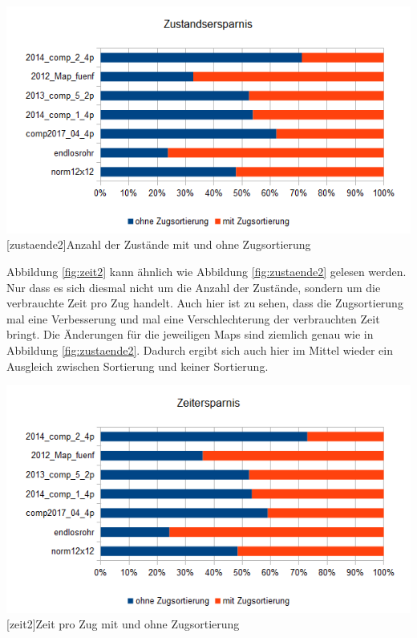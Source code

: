 \documentclass[12pt,a4paper,bibliography=totocnumbered,listof=totocnumbered]{scrartcl}
\begin{document}
    \vspace{1em}
    \begin{minipage}{\linewidth}
    	\centering
    	\includegraphics[width=1\linewidth]{pics/Kapitel_4/ZustandZugSort.png}
    	[zustaende2]{Anzahl der Zustände mit und ohne Zugsortierung}
    	\label{fig:zustaende2}
    \end{minipage}
    \vspace{1em}
    
    Abbildung \ref{fig:zeit2} kann ähnlich wie Abbildung \ref{fig:zustaende2} gelesen werden. Nur dass es sich diesmal nicht um die Anzahl der Zustände, sondern um die verbrauchte Zeit pro Zug handelt. Auch hier ist zu sehen, dass die Zugsortierung mal eine Verbesserung und mal eine Verschlechterung der verbrauchten Zeit bringt. Die Änderungen für die jeweiligen Maps sind ziemlich genau wie in Abbildung \ref{fig:zustaende2}. Dadurch ergibt sich auch hier im Mittel wieder ein Ausgleich zwischen Sortierung und keiner Sortierung.\newline
    
    
    \vspace{1em}
    \begin{minipage}{\linewidth}
    	\centering
    	\includegraphics[width=1\linewidth]{pics/Kapitel_4/ZeitZugSort.png}
    	[zeit2]{Zeit pro Zug mit und ohne Zugsortierung}
    	\label{fig:zeit2}
    \end{minipage}
    \vspace{1em}
    
\end{document}
